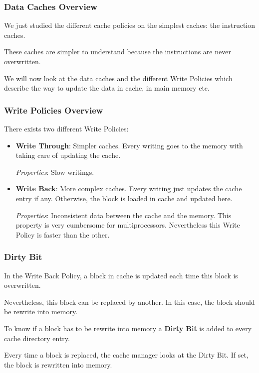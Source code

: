 \begin{frame}
  \frametitle{Data Caches Overview}

  We just studied the different cache policies on the simplest caches:
  the instruction caches.

  \-

  These caches are simpler to understand because the instructions are
  never overwritten.

  \-

  We will now look at the data caches and the different Write Policies
  which describe the way to update the data in cache, in main memory etc.
\end{frame}


\begin{frame}
  \frametitle{Write Policies Overview}

  There exists two different Write Policies:

  \begin{itemize}
    \item
      \textbf{Write Through}: Simpler caches. Every writing goes to the
      memory with taking care of updating the cache.

      \textit{Properties}: Slow writings.
    \item
      \textbf{Write Back}: More complex caches. Every writing just updates
      the cache entry if any. Otherwise, the block is loaded in cache
      and updated here.

      \textit{Properties}: Inconsistent data between the cache and the memory.
      This property is very cumbersome for multiprocessors. Nevertheless this
      Write Policy is faster than the other.
  \end{itemize}
\end{frame}


\begin{frame}
  \frametitle{Dirty Bit}

  In the Write Back Policy, a block in cache is updated each time this
  block is overwritten.

  \-

  Nevertheless, this block can be replaced by another. In this case, the
  block should be rewrite into memory.

  \-

  To know if a block has to be rewrite into memory a \textbf{Dirty Bit} is
  added to every cache directory entry.

  \-

  Every time a block is replaced, the cache manager looks at the Dirty Bit.
  If set, the block is rewritten into memory.
\end{frame}

